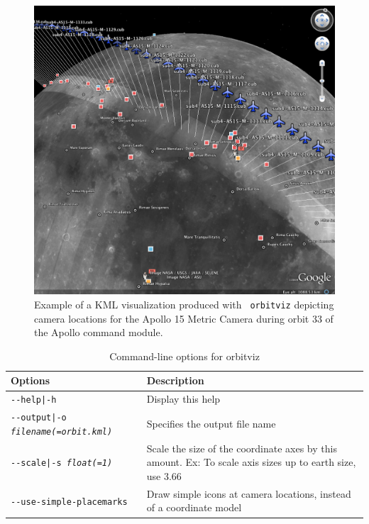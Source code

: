 \begin{figure}[ht]
  \begin{center}
  \includegraphics[width=6in]{images/orbitviz_ge_result.png}
  \end{center}
  \caption{ Example of a \ac{KML} visualization produced with {\tt
      orbitviz} depicting camera locations for the Apollo 15 Metric
    Camera during orbit 33 of the Apollo command module.}
  \label{fig:orbitviz_example}
\end{figure}

\begin{longtable}{|l|p{10cm}|}
\caption{Command-line options for orbitviz}
\label{tbl:orbitviz}
\endfirsthead
\endhead
\endfoot
\endlastfoot
\hline
Options & Description \\ \hline \hline
\texttt{-\/-help|-h} & Display this help \\ \hline
\texttt{-\/-output|-o \textit{filename(=orbit.kml)}} & Specifies the output file name \\ \hline
\texttt{-\/-scale|-s \textit{float(=1)}} & Scale the size of the coordinate axes by this amount. Ex: To scale axis sizes up to earth size, use 3.66 \\ \hline
\texttt{-\/-use-simple-placemarks} & Draw simple icons at camera locations, instead of a coordinate model \\ \hline
\end{longtable}


